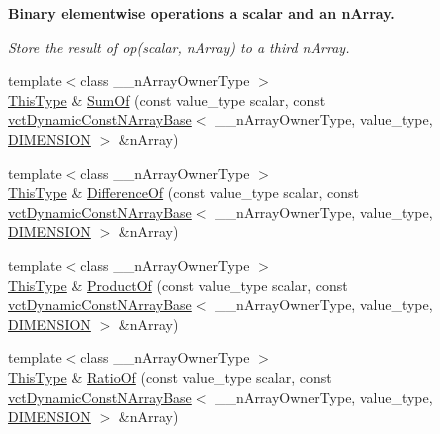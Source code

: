 \begin{Indent}{\bf Binary elementwise operations a scalar and an n\+Array.}\par
{\em Store the result of op(scalar, n\+Array) to a third n\+Array. }\begin{DoxyCompactItemize}
\item 
{\footnotesize template$<$class \+\_\+\+\_\+n\+Array\+Owner\+Type $>$ }\\\hyperlink{classvct_dynamic_const_n_array_base_a5123caffcf1455a1b99003877eade897}{This\+Type} \& \hyperlink{classvct_dynamic_n_array_base_adf34c165d5ebfabe1e5503861df394de}{Sum\+Of} (const value\+\_\+type scalar, const \hyperlink{classvct_dynamic_const_n_array_base}{vct\+Dynamic\+Const\+N\+Array\+Base}$<$ \+\_\+\+\_\+n\+Array\+Owner\+Type, value\+\_\+type, \hyperlink{classvct_dynamic_n_array_base_aa66532d28588bdf26d08fb593db815d6abfcde386ec801b212d7c42d63a4f3837}{D\+I\+M\+E\+N\+S\+I\+O\+N} $>$ \&n\+Array)
\item 
{\footnotesize template$<$class \+\_\+\+\_\+n\+Array\+Owner\+Type $>$ }\\\hyperlink{classvct_dynamic_const_n_array_base_a5123caffcf1455a1b99003877eade897}{This\+Type} \& \hyperlink{classvct_dynamic_n_array_base_ae3bf1a4f57b37308c080a6952be5426a}{Difference\+Of} (const value\+\_\+type scalar, const \hyperlink{classvct_dynamic_const_n_array_base}{vct\+Dynamic\+Const\+N\+Array\+Base}$<$ \+\_\+\+\_\+n\+Array\+Owner\+Type, value\+\_\+type, \hyperlink{classvct_dynamic_n_array_base_aa66532d28588bdf26d08fb593db815d6abfcde386ec801b212d7c42d63a4f3837}{D\+I\+M\+E\+N\+S\+I\+O\+N} $>$ \&n\+Array)
\item 
{\footnotesize template$<$class \+\_\+\+\_\+n\+Array\+Owner\+Type $>$ }\\\hyperlink{classvct_dynamic_const_n_array_base_a5123caffcf1455a1b99003877eade897}{This\+Type} \& \hyperlink{classvct_dynamic_n_array_base_aa1dfbcdb1d5003c1154a15c766206b45}{Product\+Of} (const value\+\_\+type scalar, const \hyperlink{classvct_dynamic_const_n_array_base}{vct\+Dynamic\+Const\+N\+Array\+Base}$<$ \+\_\+\+\_\+n\+Array\+Owner\+Type, value\+\_\+type, \hyperlink{classvct_dynamic_n_array_base_aa66532d28588bdf26d08fb593db815d6abfcde386ec801b212d7c42d63a4f3837}{D\+I\+M\+E\+N\+S\+I\+O\+N} $>$ \&n\+Array)
\item 
{\footnotesize template$<$class \+\_\+\+\_\+n\+Array\+Owner\+Type $>$ }\\\hyperlink{classvct_dynamic_const_n_array_base_a5123caffcf1455a1b99003877eade897}{This\+Type} \& \hyperlink{classvct_dynamic_n_array_base_a9b6660dfcc04e155fac6b2af58b5b743}{Ratio\+Of} (const value\+\_\+type scalar, const \hyperlink{classvct_dynamic_const_n_array_base}{vct\+Dynamic\+Const\+N\+Array\+Base}$<$ \+\_\+\+\_\+n\+Array\+Owner\+Type, value\+\_\+type, \hyperlink{classvct_dynamic_n_array_base_aa66532d28588bdf26d08fb593db815d6abfcde386ec801b212d7c42d63a4f3837}{D\+I\+M\+E\+N\+S\+I\+O\+N} $>$ \&n\+Array)

\end{DoxyCompactItemize}
\end{Indent}
